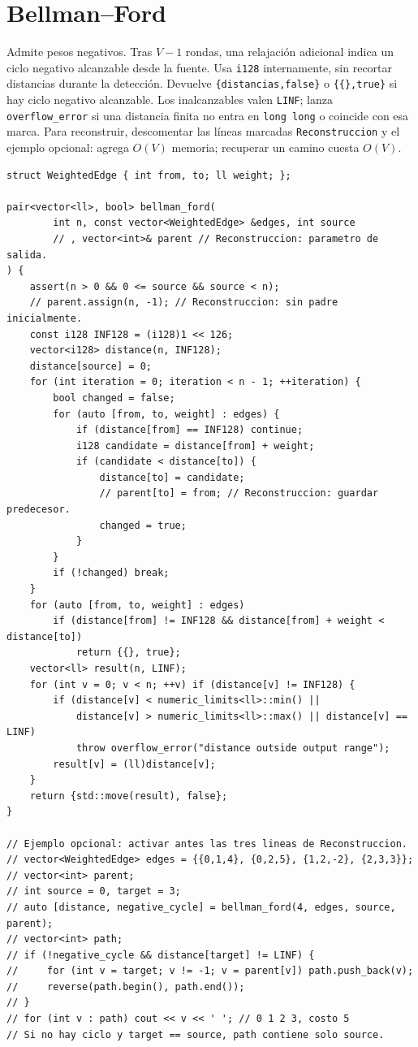 \section{Bellman--Ford}

Admite pesos negativos. Tras $V-1$ rondas, una relajaci\'on adicional indica
un ciclo negativo alcanzable desde la fuente. Usa \texttt{i128} internamente,
sin recortar distancias durante la detecci\'on. Devuelve \texttt{\{distancias,false\}}
o \texttt{\{\{\},true\}} si hay ciclo negativo alcanzable. Los inalcanzables valen
\texttt{LINF}; lanza \texttt{overflow\_error} si una distancia finita no entra en
\texttt{long long} o coincide con esa marca.
Para reconstruir, descomentar las l\'ineas marcadas \texttt{Reconstruccion} y
el ejemplo opcional: agrega $O(V)$ memoria; recuperar un camino cuesta $O(V)$.

\begin{lstlisting}[style=cpp]
struct WeightedEdge { int from, to; ll weight; };

pair<vector<ll>, bool> bellman_ford(
        int n, const vector<WeightedEdge> &edges, int source
        // , vector<int>& parent // Reconstruccion: parametro de salida.
) {
    assert(n > 0 && 0 <= source && source < n);
    // parent.assign(n, -1); // Reconstruccion: sin padre inicialmente.
    const i128 INF128 = (i128)1 << 126;
    vector<i128> distance(n, INF128);
    distance[source] = 0;
    for (int iteration = 0; iteration < n - 1; ++iteration) {
        bool changed = false;
        for (auto [from, to, weight] : edges) {
            if (distance[from] == INF128) continue;
            i128 candidate = distance[from] + weight;
            if (candidate < distance[to]) {
                distance[to] = candidate;
                // parent[to] = from; // Reconstruccion: guardar predecesor.
                changed = true;
            }
        }
        if (!changed) break;
    }
    for (auto [from, to, weight] : edges)
        if (distance[from] != INF128 && distance[from] + weight < distance[to])
            return {{}, true};
    vector<ll> result(n, LINF);
    for (int v = 0; v < n; ++v) if (distance[v] != INF128) {
        if (distance[v] < numeric_limits<ll>::min() ||
            distance[v] > numeric_limits<ll>::max() || distance[v] == LINF)
            throw overflow_error("distance outside output range");
        result[v] = (ll)distance[v];
    }
    return {std::move(result), false};
}

// Ejemplo opcional: activar antes las tres lineas de Reconstruccion.
// vector<WeightedEdge> edges = {{0,1,4}, {0,2,5}, {1,2,-2}, {2,3,3}};
// vector<int> parent;
// int source = 0, target = 3;
// auto [distance, negative_cycle] = bellman_ford(4, edges, source, parent);
// vector<int> path;
// if (!negative_cycle && distance[target] != LINF) {
//     for (int v = target; v != -1; v = parent[v]) path.push_back(v);
//     reverse(path.begin(), path.end());
// }
// for (int v : path) cout << v << ' '; // 0 1 2 3, costo 5
// Si no hay ciclo y target == source, path contiene solo source.
\end{lstlisting}

